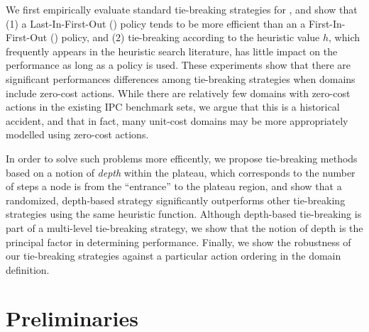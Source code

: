 We first empirically evaluate standard tie-breaking strategies for \astar, and show that 
% 
(1) a Last-In-First-Out (\lifo) policy tends to be more efficient than an a First-In-First-Out (\fifo) policy, and 
% 
(2) tie-breaking according to the heuristic value $h$, which
frequently appears in the heuristic search literature, has little 
impact on the performance as long as a \lifo policy is used.
% 
These experiments show that there are significant performances differences among tie-breaking strategies
when domains include zero-cost actions.  While there are relatively few domains with zero-cost actions in the existing IPC benchmark sets, we argue that this is a historical accident, and that in fact, many unit-cost domains may be more appropriately modelled using zero-cost actions.

In order to solve such problems more efficently,
we propose 
tie-breaking methods
based on a notion of \emph{depth} within the plateau, which corresponds to the number of steps 
a node is from the ``entrance'' to the plateau region, and show that a randomized, depth-based strategy
significantly outperforms 
other tie-breaking strategies using the same heuristic function.
Although depth-based tie-breaking is part of a multi-level tie-breaking strategy,
we show that the notion of depth is the principal factor in determining performance.
Finally, we show the robustness of our tie-breaking strategies
against a particular action ordering in the domain definition.





\section{Preliminaries}

